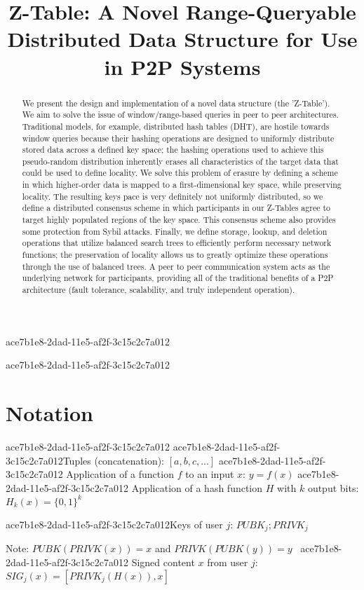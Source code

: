 \documentclass[12pt]{article}
\title{Z-Table: A Novel Range-Queryable Distributed Data Structure for Use in P2P Systems}
\begin{document}
ace7b1e8-2dad-11e5-af2f-3c15c2c7a012
\maketitle

\begin{abstract}
We present the design and implementation of a novel data structure (the 'Z-Table'). We aim to solve the issue of window/range-based queries in peer to peer architectures. Traditional models, for example,  distributed hash tables (DHT), are hostile towards window queries because their hashing operations are designed to uniformly distribute stored data across a defined key space; the hashing operations used to achieve this pseudo-random distribution inherently erases all characteristics of the target data that could be used to define locality. We solve this problem of erasure by defining a scheme in which higher-order data is mapped to a first-dimensional key space, while preserving locality. The resulting keys pace is very definitely not uniformly distributed, so we define a distributed consensus scheme in which participants in our Z-Tables agree to target highly populated regions of the key space. This consensus scheme also provides some protection from Sybil attacks. Finally, we define storage, lookup, and deletion operations that utilize balanced search trees to efficiently perform necessary network functions; the preservation of locality allows us to greatly optimize these operations through the use of balanced trees. A peer to peer communication system acts as the underlying network for participants, providing all of the traditional benefits of a P2P architecture (fault tolerance, scalability, and truly independent operation).
\end{abstract}
ace7b1e8-2dad-11e5-af2f-3c15c2c7a012
\section{Notation}
ace7b1e8-2dad-11e5-af2f-3c15c2c7a012
ace7b1e8-2dad-11e5-af2f-3c15c2c7a012Tuples (concatenation): $[a,b,c,...]$
ace7b1e8-2dad-11e5-af2f-3c15c2c7a012
Application of a function $f$ to an input $x$: $y=f(x)$
ace7b1e8-2dad-11e5-af2f-3c15c2c7a012
Application of a hash function $H$ with $k$ output bits: $H_{k}(x) = \{0,1\}^k$

ace7b1e8-2dad-11e5-af2f-3c15c2c7a012Keys of user $j$: $ PUBK_j; PRIVK_j $

Note: $PUBK(PRIVK(x)) = x$ and $PRIVK(PUBK(y)) = y$~
ace7b1e8-2dad-11e5-af2f-3c15c2c7a012
Signed content $x$ from user $j$: $SIG_j(x) = \left[ PRIVK_j( H(x) ), x \right]$
\end{document}
